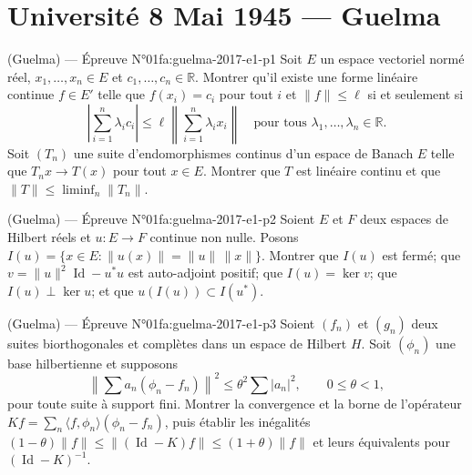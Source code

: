 \section{Université 8 Mai 1945 --- Guelma}
\begin{problem}{(Guelma) — Épreuve N°01}{fa:guelma-2017-e1-p1}
Soit $E$ un espace vectoriel normé réel, $x_1,\dots,x_n\in E$ et $c_1,\dots,c_n\in\mathbb R$. Montrer qu'il existe une forme linéaire continue $f\in E'$ telle que $f(x_i)=c_i$ pour tout $i$ et $\|f\|\le\ell$ si et seulement si
$$\left|\sum_{i=1}^n\lambda_i c_i\right|\le\ell\left\|\sum_{i=1}^n\lambda_i x_i\right\|\quad\text{pour tous }\lambda_1,\dots,\lambda_n\in\mathbb R.$$
Soit $(T_n)$ une suite d'endomorphismes continus d'un espace de Banach $E$ telle que $T_nx\to T(x)$ pour tout $x\in E$. Montrer que $T$ est linéaire continu et que $\|T\|\le\liminf_n\|T_n\|$.
\end{problem}
\newpage
\begin{problem}{(Guelma) — Épreuve N°01}{fa:guelma-2017-e1-p2}
Soient $E$ et $F$ deux espaces de Hilbert réels et $u:E\to F$ continue non nulle. Posons $I(u)=\{x\in E:\|u(x)\|=\|u\|\,\|x\|\}$. Montrer que $I(u)$ est fermé; que $v=\|u\|^2\operatorname{Id}-u^*u$ est auto-adjoint positif; que $I(u)=\ker v$; que $I(u)\perp\ker u$; et que $u(I(u))\subset I(u^*)$.
\end{problem}
\newpage
\begin{problem}{(Guelma) — Épreuve N°01}{fa:guelma-2017-e1-p3}
Soient $(f_n)$ et $(g_n)$ deux suites biorthogonales et complètes dans un espace de Hilbert $H$. Soit $(\phi_n)$ une base hilbertienne et supposons
$$\left\|\sum a_n(\phi_n-f_n)\right\|^2\le\theta^2\sum|a_n|^2,\qquad0\le\theta<1,$$
pour toute suite à support fini. Montrer la convergence et la borne de l'opérateur $Kf=\sum_n\langle f,\phi_n\rangle(\phi_n-f_n)$, puis établir les inégalités $(1-\theta)\|f\|\le\|(\operatorname{Id}-K)f\|\le(1+\theta)\|f\|$ et leurs équivalents pour $(\operatorname{Id}-K)^{-1}$.
\end{problem}
\newpage
